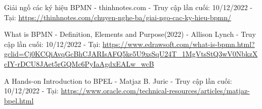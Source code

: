 
\begin{thebibliography}{9}
    Giải ngố các ký hiệu BPMN - thinhnotes.com - Truy cập lần cuối: 10/12/2022 - Tại: \url{https://thinhnotes.com/chuyen-nghe-ba/giai-ngo-cac-ky-hieu-bpmn/}

    What is BPMN - Definition, Elements and Purpose(2022) - Allison Lynch - Truy cập lần cuối: 10/12/2022 - Tại: \url{https://www.edrawsoft.com/what-is-bpmn.html?gclid=Cj0KCQiAvqGcBhCJARIsAFQ5ke5U9xsSqU24T_1MgVtsStQ3wV0NbkzXcIY-rDCU8JAet5rGQMc6PyIaAgdxEALw_wcB}

    A Hands-on Introduction to BPEL - Matjaz B. Juric - Truy cập lần cuối: 10/12/2022 - Tại: \url{https://www.oracle.com/technical-resources/articles/matjaz-bpel.html}
    
\end{thebibliography}